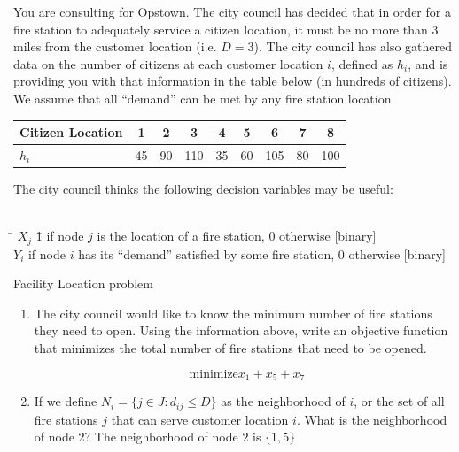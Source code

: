\documentclass[letterpaper,oneside,12pt]{article}%
\newcommand{\blu}{\color{blue}}
\begin{document}
\begin{enumerate}
\begin{center}
\begin{tikzpicture}
        \end{tikzpicture}
\end{center}

You are consulting for Opstown.  The city council has decided that in order for a fire station to adequately service a citizen location, it must be no more than 3 miles from the customer location (i.e. $D=3$).  The city council has also gathered data on the number of citizens at each customer location $i$, defined as $h_i$, and is providing you with that information in the table below (in hundreds of citizens).  We assume that all ``demand'' can be met by any fire station location.

\vspace{0.25cm}

\begin{tabular}{l|c|c|c|c|c|c|c|c|}
Citizen Location &  1	&	2	&	3	&	4	&
5	&	6	&	7	&	8	
\\
\hline
$h_i$ & 45	&	90	&	110	&	35	&	60	&	105	&	80	&	100	
\end{tabular}

\vspace{.5cm}

\noindent The city council thinks the following decision variables may be useful:
\begin{tabbing}
\\[0.2cm]
\hspace*{.5cm} \= $X_j$ \hspace{1cm} \= 1 if node $j$ is the location of a fire station, 0 otherwise  [binary] \\
\> $Y_{i}$  if node $i$ has its ``demand'' satisfied by some fire station, 0 otherwise  [binary] \\ 
\end{tabbing}

{
\blu Facility Location problem
}

\begin{enumerate}
\item The city council would like to know the minimum number of fire stations they need to open.  Using the information above, write an objective function that minimizes the total number of fire stations that need to be opened.

{
\blu
\[
\text{minimize} x_1 + x_5+x_7
\]
}

\item If we define $N_i = \{ j \in J: d_{ij} \leq D \}$ as the neighborhood of $i$, or the set of all fire stations $j$ that can serve customer location $i$.  What is the neighborhood of node 2?
{ \blu
The neighborhood of node $2$ is $\{1,5\}$
}


\end{enumerate}
\end{enumerate}
\end{document}
